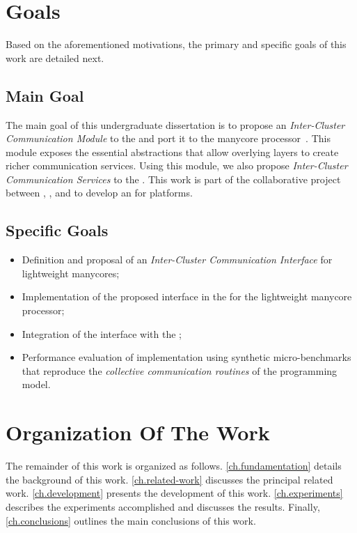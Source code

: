 \section{Goals}
\label{sec.goals}

	Based on the aforementioned motivations, the primary and specific
	goals of this work are detailed next.

\subsection{Main Goal}
\label{sec.goals.main}

	The main goal of this undergraduate dissertation is to propose an
	\textit{Inter-Cluster Communication Module} to the \nanvix
	\textit{\hal} and port it to the \mppa manycore
	processor~\cite{DeDinechin2013-1}. This module exposes the
	essential abstractions that allow overlying layers to create richer
	communication services. Using this module, we also
	propose \textit{Inter-Cluster Communication Services} to the \nanvix
	\microkernel. This work is part of the collaborative project between
	\ufsc, \pucminas, and \uga to develop an \os for \lightweight \manycore platforms.

\subsection{Specific Goals}
\label{sec.goals.specific}

	\begin{itemize}
		\item Definition and proposal of an \textit{Inter-Cluster Communication Interface} for lightweight manycores;

		\item Implementation of the proposed interface in the \nanvix \hal for the \mppa lightweight manycore processor;
        
		\item Integration of the \nanvix \hal interface with the \nanvix \microkernel;
		
		\item Performance evaluation of \nanvix \microkernel implementation using synthetic micro-benchmarks that reproduce the \textit{collective communication routines} of the \mpi programming model.
	\end{itemize}

\section{Organization Of The Work}
\label{sec.organization}
	
	The remainder of this work is organized as follows.
	\autoref{ch.fundamentation} details the background of this work.
	\autoref{ch.related-work} discusses the principal related work.
	\autoref{ch.development} presents the development of this work.
	\autoref{ch.experiments} describes the experiments accomplished and
	discusses the results. Finally, \autoref{ch.conclusions} outlines
	the main conclusions of this work.
